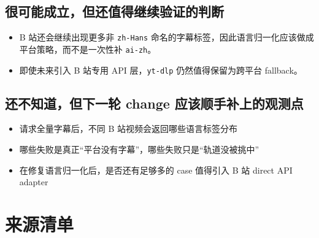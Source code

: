 \documentclass[a4paper]{article}
\begin{document}
\subsection{很可能成立，但还值得继续验证的判断}

\begin{itemize}
\item B 站还会继续出现更多非 \texttt{zh-Hans} 命名的字幕标签，因此语言归一化应该做成平台策略，而不是一次性补 \texttt{ai-zh}。
\item 即使未来引入 B 站专用 API 层，\texttt{yt-dlp} 仍然值得保留为跨平台 fallback。
\end{itemize}

\subsection{还不知道，但下一轮 change 应该顺手补上的观测点}

\begin{itemize}
\item 请求全量字幕后，不同 B 站视频会返回哪些语言标签分布
\item 哪些失败是真正“平台没有字幕”，哪些失败只是“轨道没被挑中”
\item 在修复语言归一化后，是否还有足够多的 case 值得引入 B 站 direct API adapter
\end{itemize}

\appendix
\section{来源清单}
\end{document}

